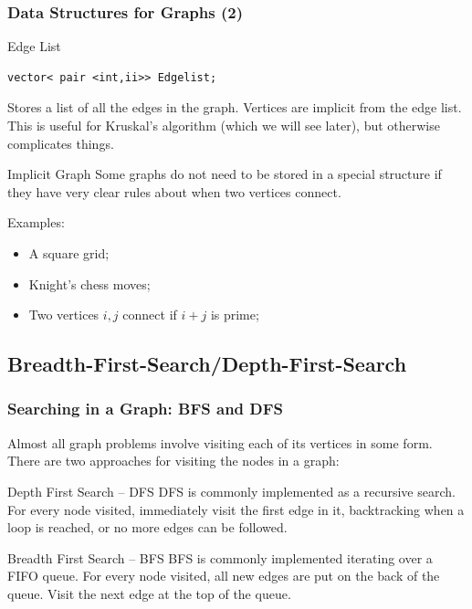 \documentclass{beamer}
\begin{document}
\begin{frame}[fragile]
  \frametitle{Data Structures for Graphs (2)}
  {\smaller
    \begin{block}{Edge List}
\begin{verbatim}
vector< pair <int,ii>> Edgelist;
\end{verbatim}

    Stores a list of all the edges in the graph. Vertices are implicit
    from the edge list. This is useful for Kruskal's algorithm (which
    we will see later), but otherwise complicates things.
    \end{block}

    \begin{block}{Implicit Graph}
      Some graphs \alert{do not} need to be stored in a special
      structure if they have very clear rules about when two vertices connect.
      \medskip

      Examples:
      \begin{itemize}
      \item A square grid;
      \item Knight's chess moves;
      \item Two vertices $i,j$ connect if $i+j$ is prime;
      \end{itemize}

    \end{block}
  }
\end{frame}


\subsection{Breadth-First-Search/Depth-First-Search}
\begin{frame}
  \frametitle{Searching in a Graph: BFS and DFS}   
  {\small
  Almost all graph problems involve visiting each of its vertices in
  some form. There are two approaches for visiting the nodes in a graph:

  \begin{block}{Depth First Search -- DFS}
    DFS is commonly implemented as a recursive search. For every node
    visited, immediately visit the first edge in it, backtracking when 
    a loop is reached, or no more edges can be followed.
  \end{block}

  \begin{block}{Breadth First Search -- BFS}
    BFS is commonly implemented iterating over a FIFO queue. For every
    node visited, all new edges are put on the back of the queue. Visit
    the next edge at the top of the queue.
  \end{block}}
\end{frame}
\end{document}
